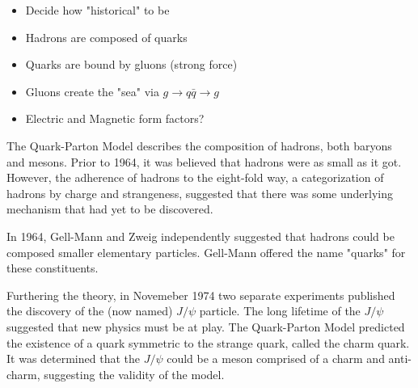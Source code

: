 \begin{itemize}
\item Decide how "historical" to be
\item Hadrons are composed of quarks
\item Quarks are bound by gluons (strong force)
\item Gluons create the "sea" via $g\rightarrow q\bar{q}\rightarrow g$
\item Electric and Magnetic form factors?
\end{itemize}

The Quark-Parton Model describes the composition of hadrons, both baryons and mesons. Prior to 1964, it was believed that hadrons were as small as it got. However, the adherence of hadrons to the eight-fold way, a categorization of hadrons by charge and strangeness, suggested that there was some underlying mechanism that had yet to be discovered.

In 1964, Gell-Mann and Zweig independently suggested that hadrons could be composed smaller elementary particles. Gell-Mann offered the name "quarks" for these constituents.

Furthering the theory, in Novemeber 1974 two separate experiments published the discovery of the (now named) $J/\psi$ particle. The long lifetime of the $J/\psi$ suggested that new physics must be at play. The Quark-Parton Model predicted the existence of a quark symmetric to the strange quark, called the charm quark. It was determined that the $J/\psi$ could be a meson comprised of a charm and anti-charm, suggesting the validity of the model.